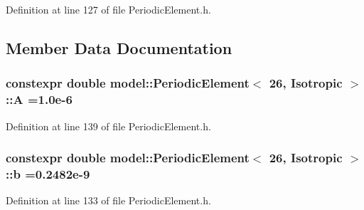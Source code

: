 Definition at line 127 of file Periodic\+Element.\+h.



\subsection{Member Data Documentation}
\hypertarget{structmodel_1_1_periodic_element_3_0126_00_01_isotropic_01_4_ad44bc8b4c3234902a51c92648f0d9c8c}{}
\subsubsection[{A}]{\setlength{\rightskip}{0pt plus 5cm}constexpr double {\bf model\+::\+Periodic\+Element}$<$ 26, {\bf Isotropic} $>$\+::A =1.\+0e-\/6\hspace{0.3cm}{\ttfamily [static]}}\label{structmodel_1_1_periodic_element_3_0126_00_01_isotropic_01_4_ad44bc8b4c3234902a51c92648f0d9c8c}


Definition at line 139 of file Periodic\+Element.\+h.

\hypertarget{structmodel_1_1_periodic_element_3_0126_00_01_isotropic_01_4_a00b0025c9e63ebc7b70a17eab0b6866e}{}
\subsubsection[{b}]{\setlength{\rightskip}{0pt plus 5cm}constexpr double {\bf model\+::\+Periodic\+Element}$<$ 26, {\bf Isotropic} $>$\+::b =0.\+2482e-\/9\hspace{0.3cm}{\ttfamily [static]}}\label{structmodel_1_1_periodic_element_3_0126_00_01_isotropic_01_4_a00b0025c9e63ebc7b70a17eab0b6866e}


Definition at line 133 of file Periodic\+Element.\+h.

\hypertarget{structmodel_1_1_periodic_element_3_0126_00_01_isotropic_01_4_a56ae5b1281c97a91195b7656342f31d9}{}
